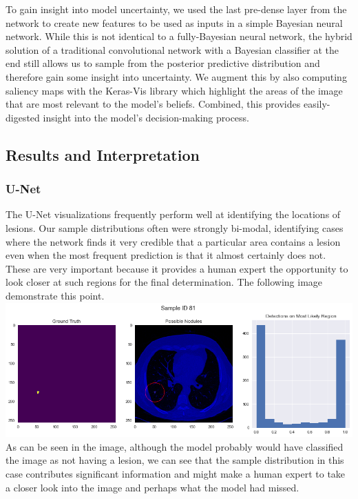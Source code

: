 \documentclass[12pt]{article}
\begin{document}
{To gain insight into model uncertainty, we used the last pre-dense layer from the network to create new features to be used as inputs in a simple Bayesian neural network. While this is not identical to a fully-Bayesian neural network, the hybrid solution of a traditional convolutional network with a Bayesian classifier at the end still allows us to sample from the posterior predictive distribution and therefore gain some insight into uncertainty. We augment this by also computing saliency maps with the Keras-Vis library which highlight the areas of the image that are most relevant to the model's beliefs. Combined, this provides easily-digested insight into the model's decision-making process.

\subsection*{Results and Interpretation}

\subsubsection*{U-Net}
The U-Net visualizations frequently perform well at identifying the locations of lesions. Our sample distributions often were strongly bi-modal, identifying cases where the network finds it very credible that a particular area contains a lesion even when the most frequent prediction is that it almost certainly does not. These are very important because it provides a human expert the opportunity to look closer at such regions for the final determination. The following image demonstrate this point. \\

\includegraphics[scale=0.5]{conflicted_no_nodule.png} \\

As can be seen in the image, although the model probably would have classified the image as not having a lesion, we can see that the sample distribution in this case contributes significant information and might make a human expert to take a closer look into the image and perhaps what the model had missed. \\

}
\end{document}
